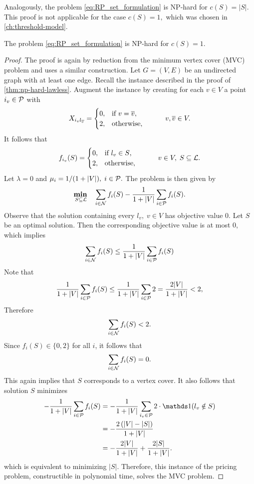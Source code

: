 Analogously, the problem \eqref{eq:RP_set_formulation} is NP-hard for $c(S) = |S|.$
This proof is not applicable for the case $c(S) = 1,$ which was chosen in \autoref{ch:threshold-model}.

\begin{theorem}
    \label{thm:np-hard}
    The problem \eqref{eq:RP_set_formulation} is NP-hard for $c(S) = 1$.
\end{theorem}

\begin{proof}
    The proof is again by reduction from the minimum vertex cover (MVC) problem and uses a similar construction.
    Let $G=(V,E)$ be an undirected graph with at least one edge.
    Recall the instance described in the proof of \autoref{thm:np-hard-lawless}.
    Augment the instance by creating for each $v \in V$ a point $i_v \in \P$ with
    \[X_{i_v l_{\overline{v}}} = \begin{cases}
                                    0, & \text{if $v = \overline{v}$}, \\
                                    2, & \text{otherwise},
    \end{cases} \tquad v,\overline{v} \in V.\]
    It follows that
    \[
        f_{i_v}(S) = \begin{cases}
                           0, & \text{if $l_v \in S$,} \\
                           2, & \text{otherwise},
        \end{cases}
        \tquad v \in V, \; S \subseteq \L.
    \]
    Let $\lambda = 0$ and $\mu_i = 1/(1 + |V|), \; i \in \P.$
    The problem is then given by
    \[\umin{S \subseteq \L} \quad \sum\limits_{i \in \N} f_i(S) - \frac{1}{1+|V|} \sum\limits_{i \in \P} f_i(S).\]
    Observe that the solution containing every $l_v, \; v \in V$ has objective value $0$.
    Let $S$ be an optimal solution.
    Then the corresponding objective value is at most $0$, which implies
    \[
        \sum\limits_{i \in \N} f_i(S) \leq \frac{1}{1+|V|} \sum\limits_{i \in \P} f_i(S)
    \]
    Note that
    \[
        \frac{1}{1+|V|} \sum\limits_{i \in \P} f_i(S) \leq \frac{1}{1+|V|} \sum\limits_{i \in \P} 2 = \frac{2|V|}{1+|V|} < 2,
    \]
    Therefore
    \[
        \sum\limits_{i \in \N} f_i(S) < 2.
    \]
    Since $f_i(S) \in \{0,2\}$ for all $i$,
    it follows that
    \[\sum\limits_{i \in \N} f_i(S) = 0.\]
    This again implies that $S$ corresponds to a vertex cover.
    It also follows that solution $S$ minimizes
    \[
        \begin{split}
            -\frac{1}{1+|V|} \sum\limits_{i \in \P} f_i(S) &= -\frac{1}{1+|V|} \sum\limits_{i_v \in \P} 2 \cdot \Ind(l_v \notin S)
            \\ &= -\frac{2\left(|V| - |S|\right)}{1 + |V|} \\ &= -\frac{2|V|}{1 + |V|} + \frac{2|S|}{1+|V|}.
        \end{split}
        \]
    which is equivalent to minimizing $|S|$.
    Therefore, this instance of the pricing problem, constructible in polynomial time, solves the MVC problem. \qedhere
\end{proof}
